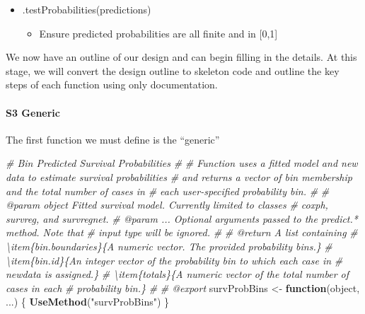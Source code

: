 \documentclass[
]{book}
\newenvironment{Shaded}{\begin{snugshade}}{\end{snugshade}}
\newcommand{\CommentTok}[1]{\textcolor[rgb]{0.56,0.35,0.01}{\textit{#1}}}
\newcommand{\ControlFlowTok}[1]{\textcolor[rgb]{0.13,0.29,0.53}{\textbf{#1}}}
\newcommand{\FunctionTok}[1]{\textcolor[rgb]{0.13,0.29,0.53}{\textbf{#1}}}
\newcommand{\NormalTok}[1]{#1}
\newcommand{\OtherTok}[1]{\textcolor[rgb]{0.56,0.35,0.01}{#1}}
\newcommand{\StringTok}[1]{\textcolor[rgb]{0.31,0.60,0.02}{#1}}
\providecommand{\tightlist}{%
  \setlength{\itemsep}{0pt}\setlength{\parskip}{0pt}}
\begin{document}
\begin{itemize}
  \begin{itemize}
  \tightlist
  \item
    .testProbabilities(predictions)

    \begin{itemize}
    \tightlist
    \item
      Ensure predicted probabilities are all finite and in {[}0,1{]}
    \end{itemize}
  \end{itemize}
\end{itemize}

We now have an outline of our design and can begin filling in the details. At this stage, we will convert the design outline to skeleton code and outline the key steps of each function using only documentation.

\hypertarget{s3-generic}{%
\paragraph{S3 Generic}\label{s3-generic}}

The first function we must define is the ``generic''

\begin{Shaded}
\begin{Highlighting}[]
\CommentTok{\#\textquotesingle{} Bin Predicted Survival Probabilities}
\CommentTok{\#\textquotesingle{} }
\CommentTok{\#\textquotesingle{} Function uses a fitted model and new data to estimate survival probabilities}
\CommentTok{\#\textquotesingle{}   and returns a vector of bin membership and the total number of cases in}
\CommentTok{\#\textquotesingle{}   each user{-}specified probability bin.}
\CommentTok{\#\textquotesingle{}   }
\CommentTok{\#\textquotesingle{} @param object Fitted survival model. Currently limited to classes}
\CommentTok{\#\textquotesingle{}   \textasciigrave{}coxph\textasciigrave{}, \textasciigrave{}survreg\textasciigrave{}, and \textasciigrave{}survregnet\textasciigrave{}.}
\CommentTok{\#\textquotesingle{} @param ... Optional arguments passed to the \textasciigrave{}predict.*\textasciigrave{} method. Note that}
\CommentTok{\#\textquotesingle{}   input \textasciigrave{}type\textasciigrave{} will be ignored.}
\CommentTok{\#\textquotesingle{} }
\CommentTok{\#\textquotesingle{} @return A list containing}
\CommentTok{\#\textquotesingle{} \textbackslash{}item\{bin.boundaries\}\{A numeric vector. The provided probability bins.\}}
\CommentTok{\#\textquotesingle{} \textbackslash{}item\{bin.id\}\{An integer vector of the probability bin to which each case in }
\CommentTok{\#\textquotesingle{}   \textasciigrave{}newdata\textasciigrave{} is assigned.\}}
\CommentTok{\#\textquotesingle{} \textbackslash{}item\{totals\}\{A numeric vector of the total number of cases in each }
\CommentTok{\#\textquotesingle{}   probability bin.\}}
\CommentTok{\#\textquotesingle{} }
\CommentTok{\#\textquotesingle{} @export}
\NormalTok{survProbBins }\OtherTok{\textless{}{-}} \ControlFlowTok{function}\NormalTok{(object, ...) \{ }\FunctionTok{UseMethod}\NormalTok{(}\StringTok{"survProbBins"}\NormalTok{) \}}
\end{Highlighting}
\end{Shaded}
\end{document}

